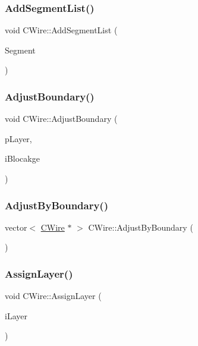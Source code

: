 \subsubsection{\texorpdfstring{AddSegmentList()}{AddSegmentList()}}
{\footnotesize\ttfamily void C\+Wire\+::\+Add\+Segment\+List (\begin{DoxyParamCaption}\item[{vector$<$ \mbox{\hyperlink{classCSegment}{C\+Segment}} $\ast$ $>$}]{Segment }\end{DoxyParamCaption})}

\mbox{\label{classCWire_a36dd73e309fe16428df29220bc161d0e}} 
\subsubsection{\texorpdfstring{AdjustBoundary()}{AdjustBoundary()}}
{\footnotesize\ttfamily void C\+Wire\+::\+Adjust\+Boundary (\begin{DoxyParamCaption}\item[{\mbox{\hyperlink{classCLayer}{C\+Layer}} $\ast$}]{p\+Layer,  }\item[{int}]{i\+Blocakge }\end{DoxyParamCaption})}

\mbox{\label{classCWire_a164104850603ca31076daf202401b77b}} 
\subsubsection{\texorpdfstring{AdjustByBoundary()}{AdjustByBoundary()}}
{\footnotesize\ttfamily vector$<$ \mbox{\hyperlink{classCWire}{C\+Wire}} $\ast$ $>$ C\+Wire\+::\+Adjust\+By\+Boundary (\begin{DoxyParamCaption}{ }\end{DoxyParamCaption})}

\mbox{\label{classCWire_a6d114fa68a8539380b0231f5d2d1a10a}} 
\subsubsection{\texorpdfstring{AssignLayer()}{AssignLayer()}}
{\footnotesize\ttfamily void C\+Wire\+::\+Assign\+Layer (\begin{DoxyParamCaption}\item[{int}]{i\+Layer }\end{DoxyParamCaption})}

